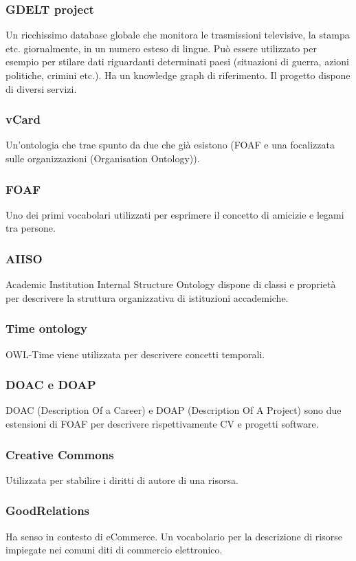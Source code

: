\subsubsection{GDELT project}
Un ricchissimo database globale che monitora le trasmissioni televisive, la stampa etc. giornalmente, in un numero esteso di lingue. Può essere utilizzato per esempio per stilare dati riguardanti determinati paesi (situazioni di guerra, azioni politiche, crimini etc.). Ha un knowledge graph di riferimento. Il progetto dispone di diversi servizi.

\subsubsection{vCard}
Un'ontologia che trae spunto da due che già esistono (FOAF e una focalizzata sulle organizzazioni (Organisation Ontology)).

\subsubsection{FOAF}
Uno dei primi vocabolari utilizzati per esprimere il concetto di amicizie e legami tra persone.

\subsubsection{AIISO}
Academic Institution Internal Structure Ontology dispone di classi e proprietà per descrivere la struttura organizzativa di istituzioni accademiche.

\subsubsection{Time ontology}
OWL-Time viene utilizzata per descrivere concetti temporali.

\subsubsection{DOAC e DOAP}
DOAC (Description Of a Career) e DOAP (Description Of A Project) sono due estensioni di FOAF per descrivere rispettivamente CV e progetti software.

\subsubsection{Creative Commons}
Utilizzata per stabilire i diritti di autore di una risorsa.

\subsubsection{GoodRelations}
Ha senso in contesto di eCommerce. Un vocabolario per la descrizione di risorse impiegate nei comuni diti di commercio elettronico.